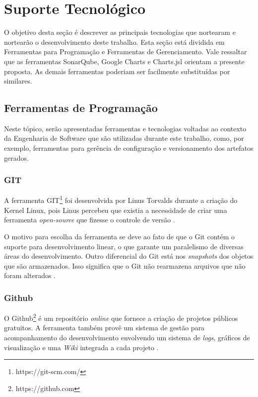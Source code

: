 
\chapter[Suporte Tecnológico]{Suporte Tecnológico}

O objetivo desta seção é descrever as principais tecnologias que nortearam e nortearão o desenvolvimento deste trabalho.  Esta seção está dividida em Ferramentas para Programação e Ferramentas de Gerenciamento. Vale ressaltar que as ferramentas SonarQube, Google Charts e Charts.jsl orientam a presente proposta. As demais ferramentas poderiam ser facilmente substituídas por similares.

\section{Ferramentas de Programação} %
\label{sec:engenharia_de_software}
	Neste tópico, serão apresentadas ferramentas e tecnologias voltadas ao contexto da Engenharia de Software que são utilizadas durante este trabalho, como, por exemplo, ferramentas para gerência de configuração e versionamento dos artefatos gerados.

	\subsection{GIT} %
	\label{sub:git}
	
		A ferramenta GIT\footnote{https://git-scm.com/} foi desenvolvida por Linus Torvalds durante a criação do Kernel Linux, pois Linus percebeu que existia a necessidade de criar uma ferramenta \textit{open-source} que fizesse o controle de versão \cite{bento_alise_2013}. 

O motivo para escolha da ferramenta se deve ao fato de que o Git contém o suporte para desenvolvimento linear, o que garante um paralelismo de diversas áreas do desenvolvimento. Outro diferencial do Git está nos \textit{snapshots} dos objetos que são armazenados. Isso significa que o Git não rearmazena arquivos que não foram alterados \cite{martinho_git_2013}.

	\subsection{Github} %
	\label{sub:github}
		O Github\footnote{https://github.com} é um repositório \textit{online} que fornece a criação de projetos públicos gratuitos. A ferramenta também provê um sistema de gestão para acompanhamento do desenvolvimento envolvendo um sistema de \textit{logs}, gráficos de visualização e uma \textit{Wiki} integrada a cada projeto \cite{martinho_git_2013}.
	
